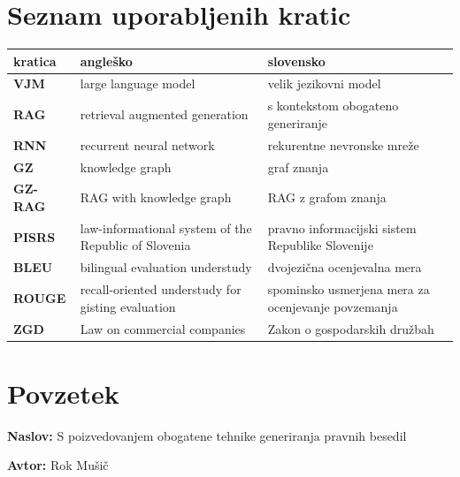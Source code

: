 \documentclass[a4paper,12pt,openright]{book}
\newcommand{\ttitle}{S poizvedovanjem obogatene tehnike generiranja pravnih besedil}
\newcommand{\tauthor}{Rok Mušič}
\newcommand{\clearemptydoublepage}{\newpage{\pagestyle{empty}\cleardoublepage}}
\begin{document}

\chapter*{Seznam uporabljenih kratic}

\noindent\begin{tabular}{p{}|p{}|p{}}    %
  {\bf kratica} & {\bf angleško}                              & {\bf slovensko} \\ \hline
  {\bf VJM} & large language model & velik jezikovni model \\
  {\bf RAG} & retrieval augmented generation & s kontekstom obogateno generiranje \\
  {\bf RNN} & recurrent neural network & rekurentne nevronske mreže \\
  {\bf GZ} & knowledge graph & graf znanja \\
  {\bf GZ-RAG} & RAG with knowledge graph & RAG z grafom znanja \\
  {\bf PISRS} & law-informational system of the Republic of Slovenia & pravno informacijski sistem Republike Slovenije \\
  {\bf BLEU} & bilingual evaluation understudy & dvojezična ocenjevalna mera \\
  {\bf ROUGE\;} & recall-oriented understudy for gisting evaluation & spominsko usmerjena mera za ocenjevanje povzemanja \\
  {\bf ZGD} & Law on commercial companies & Zakon o gospodarskih družbah
\end{tabular}


\clearemptydoublepage

{}
\chapter*{Povzetek}

\noindent\textbf{Naslov:} \ttitle
\bigskip

\noindent\textbf{Avtor:} \tauthor
\bigskip
\end{document}
